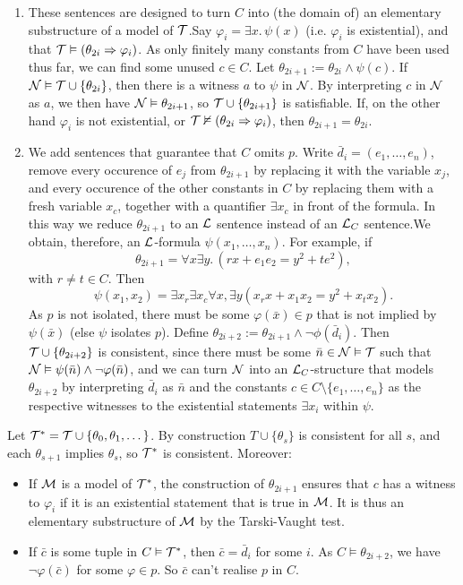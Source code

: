 \documentclass{article}
\numberwithin{thm}{subsection}
\begin{document}
\begin{enumerate}
    \item[$s=2i$.] These sentences are designed to turn $C$ into (the domain of) an elementary substructure of a model of $\mathcal{T}$.\gap Say $\varphi_i = \exists x. \, \psi(x)$ (i.e. $\varphi_i$ is existential), and that $\mathcal{T} \vDash (\theta_{2i} \Rightarrow \varphi_i)$. As only finitely many constants from $C$ have been used thus far, we can find some unused $c \in C$. Let $\theta_{2i+1} := \theta_{2i} \wedge \psi(c)$. \gap
    If $\mathcal{N} \vDash \mathcal{T} \cup \{ \theta_{2i} \}$, then there is a witness $a$ to $\psi$ in $\mathcal{N}$. By interpreting $c$ in $\mathcal{N}$ as $a$, we then have $\mathcal{N} \vDash \theta_{2i+1}$, so $\mathcal{T} \cup \{ \theta_{2i+1}\}$ is satisfiable. \gap If, on the other hand $\varphi_i$ is not existential, or $\mathcal{T} \nvDash (\theta_{2i} \Rightarrow \varphi_i)$, then $\theta_{2i+1} = \theta_{2i}$.
    \item[$s=2i+1$.] We add sentences that guarantee that $C$ omits $p$. \gap Write $\bar d_{i} = (e_1, \dots, e_n)$, remove every occurence of $e_j$ from $\theta_{2i+1}$ by replacing it with the variable $x_j$, and every occurence of the other constants in $C$ by replacing them with a fresh variable $x_c$, together with a quantifier $\exists x_c$ in front of the formula. In this way we reduce $\theta_{2i+1}$ to an $\mathcal{L}$ sentence instead of an $\mathcal{L}_C$ sentence.\gap We obtain, therefore, an $\mathcal{L}$-formula $\psi(x_{1},\dots, x_{n})$. \gap For example, if \[\theta_{2i+1} = \forall x \exists y. \, (rx +e_{1}e_{2} = y^{2}+te^{2}),\] with $r \neq t \in C$. Then \[\psi(x_{1},x_{2}) = \exists x_{r} \exists x_{c} \forall x, \exists y (x_{r}x + x_{1}x_{2} = y^{2} + x_{t}x_{2}).\] As $p$ is not isolated, there must be some $\varphi(\bar x) \in p$ that is not implied by $\psi(\bar x)$ (else $\psi$ isolates $p$). \gap 
    Define $\theta_{2i+2} := \theta_{2i+1} \wedge \neg \phi(\bar d_{i})$. Then $\mathcal{T} \cup \{ \theta_{2i+2} \}$ is consistent, since there must be some $\bar n \in \mathcal{N} \vDash \mathcal{T}$ such that $\mathcal{N} \vDash \psi(\bar n) \wedge \neg \varphi( \bar n)$, and we can turn $\mathcal{N}$ into an $\mathcal{L}_{C}$-structure that models $\theta_{2i+2}$ by interpreting $\bar d_{i}$ as $\bar n$ and the constants $c \in C \setminus \{ e_1, \dots, e_n\}$ as the respective witnesses to the existential statements $\exists x_i$ within $\psi$.
\end{enumerate}
Let $\mathcal{T}^{*} = \mathcal{T} \cup \{\theta_{0},\theta_{1}, \dots \}$. By construction $T \cup \{\theta_{s}\}$ is consistent for all $s$, and each $\theta_{s+1}$ implies $\theta_{s}$, so $\mathcal{T}^{*}$ is consistent. Moreover: \begin{itemize}
    \item If $\mathcal{M}$ is a model of $\mathcal{T}^{*}$, the construction of $\theta_{2i+1}$ ensures that $c$ has a witness to $\varphi_{i}$ if it is an existential statement that is true in $\mathcal{M}$. It is thus an elementary substructure of $\mathcal{M}$ by the Tarski-Vaught test. 
    \item If $\bar c$ is some tuple in $C \vDash \mathcal{T}^{*}$, then $\bar c = \bar d_{i}$ for some $i$. As $C \models \theta_{2i+2}$, we have $\neg \varphi(\bar c)$ for some $\varphi \in p$. So $\bar c$ can't realise $p$ in $C$.
\end{itemize}
\endproof
\end{document}
